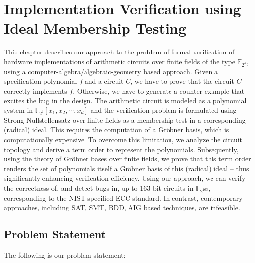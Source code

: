 \chapter{Implementation Verification using Ideal Membership Testing} \label{ch:date}

This chapter describes our approach to the problem of formal
verification of hardware implementations of arithmetic circuits over
finite fields of the type ${\mathbb{F}}_{2^k}$, using a
computer-algebra/algebraic-geometry based approach.  Given a
specification polynomial $f$ and a circuit $C$, we have to prove that
the circuit $C$ correctly implements $f$. Otherwise, we have to
generate a counter example that excites the bug in the design. 
The arithmetic circuit is modeled as a polynomial system in
${\mathbb{F}}_{2^k}[x_1,x_2,\cdots,x_d]$ and the verification problem
is formulated using Strong Nullstellensatz over finite fields as a
membership test in a corresponding (radical) ideal.   This requires
the computation of a Gr\"obner basis, which is computationally
expensive.  To overcome this limitation, we analyze 
the circuit topology and derive a term order to represent
the polynomials. Subsequently, using the theory of Gr\"obner bases
over finite fields, we prove that this term order renders the
set of polynomials itself a Gr\"obner basis of this (radical) ideal -- thus
significantly enhancing verification efficiency. Using our approach, we can
verify the correctness of, and detect bugs in, up to 163-bit circuits
in $\mathbb{F}_{2^{163}}$, corresponding to the NIST-specified ECC
standard.  In contrast, contemporary approaches, including SAT, SMT,
BDD, AIG based techniques, are infeasible. 

\section{Problem Statement}
The following is our problem statement:

